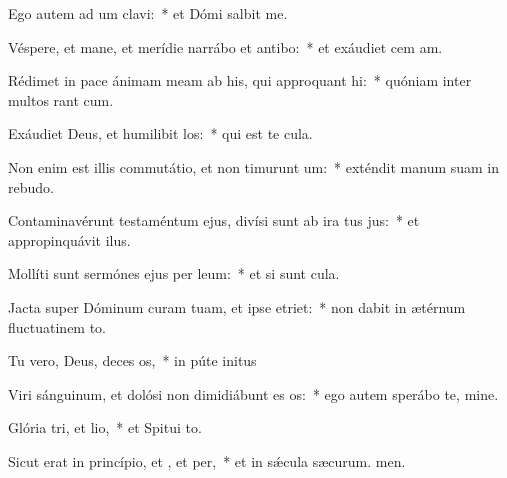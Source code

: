 \item Ego autem ad um clavi:~* et Dómi salbit me.
\item Véspere, et mane, et merídie narrábo et antibo:~* et exáudiet cem am.
\item Rédimet in pace ánimam meam ab his, qui approquant hi:~* quóniam inter multos rant cum.
\item Exáudiet Deus, et humilibit los:~* qui est te cula.
\item Non enim est illis commutátio, et non timurunt um:~* exténdit manum suam in rebudo.
\item Contaminavérunt testaméntum ejus, divísi sunt ab ira tus jus:~* et appropinquávit  ilus.
\item Mollíti sunt sermónes ejus per leum:~* et si sunt cula.
\item Jacta super Dóminum curam tuam, et ipse  etriet:~* non dabit in ætérnum fluctuatinem to.
\item Tu vero, Deus, deces os,~* in púte initus
\item Viri sánguinum, et dolósi non dimidiábunt es os:~* ego autem sperábo  te, mine.
\item Glória tri, et lio,~* et Spitui to.
\item Sicut erat in princípio, et , et per,~* et in sǽcula sæcurum. men.
